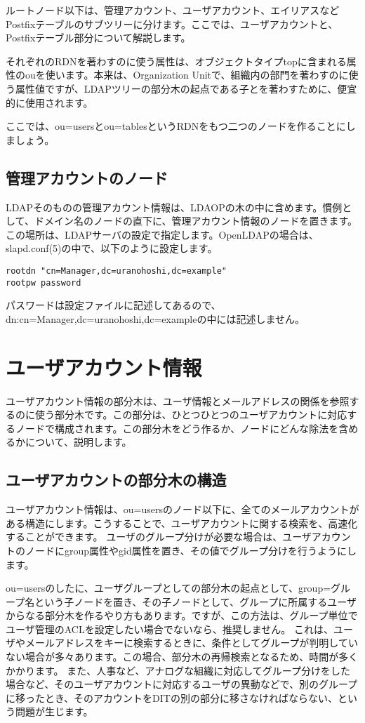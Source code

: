 ルートノード以下は、管理アカウント、ユーザアカウント、エイリアスなどPostfixテーブルのサブツリーに分けます。ここでは、ユーザアカウントと、Postfixテーブル部分について解説します。

それぞれのRDNを著わすのに使う属性は、オブジェクトタイプtopに含まれる属性のouを使います。本来は、Organization Unitで、組織内の部門を著わすのに使う属性値ですが、LDAPツリーの部分木の起点である子とを著わすために、便宜的に使用されます。

ここでは、ou=usersとou=tablesというRDNをもつ二つのノードを作ることにしましょう。

\subsection{管理アカウントのノード}

LDAPそのものの管理アカウント情報は、LDAOPの木の中に含めます。慣例として、ドメイン名のノードの直下に、管理アカウント情報のノードを置きます。この場所は、LDAPサーバの設定で指定します。OpenLDAPの場合は、slapd.conf(5)の中で、以下のように設定します。

\begin{verbatim}
rootdn "cn=Manager,dc=uranohoshi,dc=example"
rootpw password
\end{verbatim}

パスワードは設定ファイルに記述してあるので、dn:cn=Manager,dc=uranohoshi,dc=exampleの中には記述しません。

\section{ユーザアカウント情報}

ユーザアカウント情報の部分木は、ユーザ情報とメールアドレスの関係を参照するのに使う部分木です。この部分は、ひとつひとつのユーザアカウントに対応するノードで構成されます。この部分木をどう作るか、ノードにどんな除法を含めるかについて、説明します。

\subsection{ユーザアカウントの部分木の構造}

ユーザアカウント情報は、ou=usersのノード以下に、全てのメールアカウントがある構造にします。こうすることで、ユーザアカウントに関する検索を、高速化することができます。
ユーザのグループ分けが必要な場合は、ユーザアカウントのノードにgroup属性やgid属性を置き、その値でグループ分けを行うようにします。

ou=usersのしたに、ユーザグループとしての部分木の起点として、group=グループ名という子ノードを置き、その子ノードとして、グループに所属するユーザからなる部分木を作るやり方もあります。ですが、この方法は、グループ単位でユーザ管理のACLを設定したい場合でないなら、推奨しません。
これは、ユーザやメールアドレスをキーに検索するときに、条件としてグループが判明していない場合が多々あります。この場合、部分木の再帰検索となるため、時間が多くかかります。
また、人事など、アナログな組織に対応してグループ分けをした場合など、そのユーザアカウントに対応するユーザの異動などで、別のグループに移ったとき、そのアカウントをDITの別の部分に移さなければならない、という問題が生じます。

